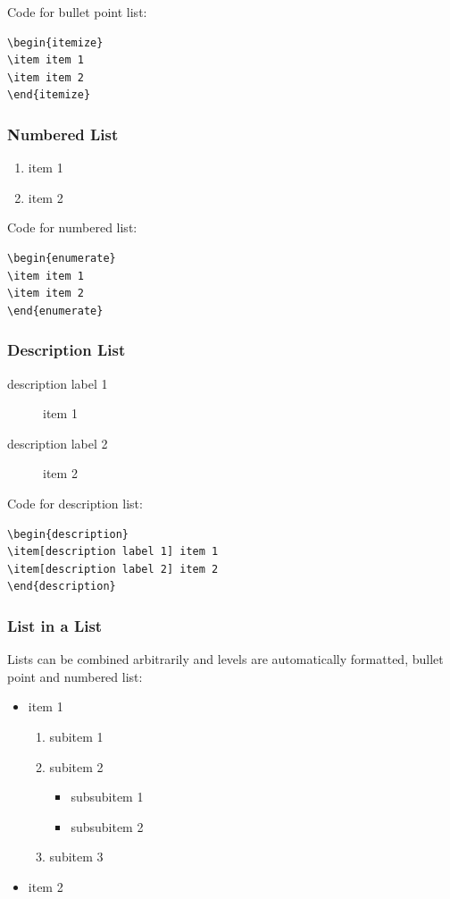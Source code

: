 Code for bullet point list:
\begin{verbatim}
\begin{itemize}
\item item 1
\item item 2
\end{itemize}
\end{verbatim}

\subsubsection{Numbered List}
\begin{enumerate}
\item item 1
\item item 2
\end{enumerate}

Code for numbered list:
\begin{verbatim}
\begin{enumerate}
\item item 1
\item item 2
\end{enumerate}
\end{verbatim}

\subsubsection{Description List}
\begin{description}
\item[description label 1] item 1
\item[description label 2] item 2
\end{description}

Code for description list:
\begin{verbatim}
\begin{description}
\item[description label 1] item 1
\item[description label 2] item 2
\end{description}
\end{verbatim}

\subsubsection{List in a List}
Lists can be combined arbitrarily and levels are automatically formatted, \eg bullet point and numbered
list:
\begin{itemize}
\item item 1
\begin{enumerate}
\item subitem 1
\item subitem 2
\begin{itemize}
\item subsubitem 1
\item subsubitem 2
\end{itemize}
\item subitem 3
\end{enumerate}
\item item 2
\end{itemize}

